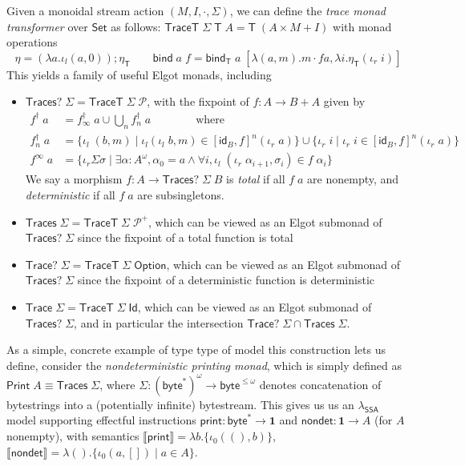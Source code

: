 \documentclass[acmsmall,screen,review]{acmart}
\newcommand{\mc}[1]{\ensuremath{\mathcal{#1}}}
\newcommand{\mb}[1]{\ensuremath{\mathbf{#1}}}
\newcommand{\ms}[1]{\ensuremath{\mathsf{#1}}}
\newcommand{\dnt}[1]{\llbracket{#1}\rrbracket}
\newcommand{\isotopessa}{\(\lambda_{\ms{SSA}}\)}
\begin{document}
\begin{definition}
  Given a monoidal stream action $(M, I, \cdot, \Sigma)$, we can define the \emph{trace
  monad transformer} over $\ms{Set}$ as follows:
  $
  \ms{TraceT}\;\Sigma\;\ms{T}\;A = \ms{T}\;(A \times M + I)
  $
  with monad operations
  $$
    \eta = (\lambda a. \iota_l (a, 0)) ; \eta_{\ms{T}} \qquad
    \ms{bind}\;a\;f 
    = \ms{bind}_{\ms{T}}\;a\;[\lambda (a, m). m \cdot f a, \lambda i. \eta_{\ms{T}}(\iota_r\;i)]
  $$
  This yields a family of useful Elgot monads, including
  \begin{itemize}
    \item $\ms{Traces}?\;\Sigma = \ms{TraceT}\;\Sigma\;\mc{P}$, with the fixpoint of 
    $f : A \to B + A$ given by
    \begin{align}
      f^\dagger\;a &= f^\dagger_\infty\;a \cup \bigcup_n f^\dagger_n\;a 
        \qquad \qquad \text{where} \\
      f^\dagger_n\;a &=
          \{\iota_l\;(b, m) \mid \iota_l(\iota_l\;b, m) \in [\ms{id}_B, f]^n(\iota_r\;a)\}
          \cup \{\iota_r\;i \mid \iota_r\;i \in [\ms{id}_B, f]^n(\iota_r\;a)\} \\
      f^\infty\;a &= \{\iota_r \Sigma \sigma \mid \exists \alpha : A^\omega, 
        \alpha_0 = a \land \forall i, \iota_l\;(\iota_r\;\alpha_{i + 1}, \sigma_i) \in f\;\alpha_i \} 
    \end{align}
    We say a morphism $f : A \to \ms{Traces}?\;\Sigma\;B$ is \emph{total} if all $f\;a$ are
    nonempty, and \emph{deterministic} if all $f\;a$ are subsingletons.
    \item $\ms{Traces}\;\Sigma = \ms{TraceT}\;\Sigma\;\mc{P}^+$, which can be viewed as an Elgot
    submonad of $\ms{Traces}?\;\Sigma$ since the fixpoint of a total function is total
    \item $\ms{Trace}?\;\Sigma = \ms{TraceT}\;\Sigma\;\ms{Option}$, which can be viewed as an Elgot
    submonad of $\ms{Traces}?\;\Sigma$ since the fixpoint of a deterministic function is
    deterministic
    \item $\ms{Trace}\;\Sigma = \ms{TraceT}\;\Sigma\;\ms{Id}$, which can be viewed as an Elgot
    submonad of $\ms{Traces}?\;\Sigma$, and in particular the intersection 
    $\ms{Trace}?\;\Sigma \cap \ms{Traces}\;\Sigma$.
  \end{itemize}
\end{definition}

As a simple, concrete example of type type of model this construction lets us define, consider the
\emph{nondeterministic printing monad}, which is simply defined as \(\ms{Print}\;A \equiv
\ms{Traces}\;\Sigma\), where \(\Sigma: (\ms{byte}^*)^\omega \to \ms{byte}^{\leq \omega}\) denotes
concatenation of bytestrings into a (potentially infinite) bytestream. This gives us us an
\isotopessa{} model supporting effectful instructions \(\ms{print}: \ms{byte}^* \to \mb{1}\) and
\(\ms{nondet}: \mb{1} \to A\) (for \(A\) nonempty), with semantics \(\dnt{\ms{print}} = \lambda
b.\{\iota_0 ((), b)\}\), \(\dnt{\ms{nondet}} = \lambda (). \{\iota_0 (a, []) \mid a \in A\}\).
\end{document}
